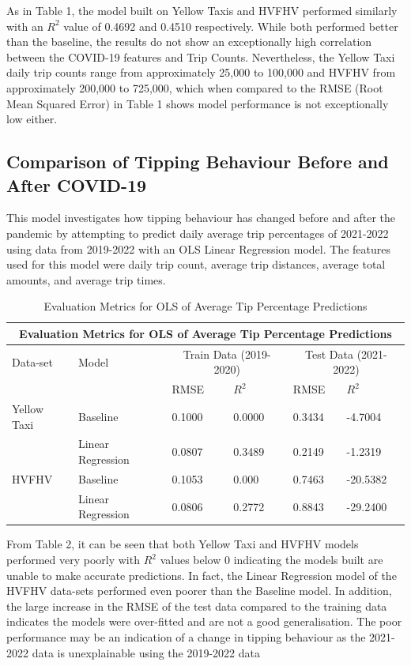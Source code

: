 \documentclass[11pt]{article}
\begin{document}
As in Table 1, the model built on Yellow Taxis and HVFHV performed similarly with an \(R^2\) value of 0.4692 and 0.4510 respectively. While both performed better than the baseline, the results do not show an exceptionally high correlation between the COVID-19 features and Trip Counts. Nevertheless, the Yellow Taxi daily trip counts range from approximately 25,000 to 100,000 and HVFHV from approximately 200,000 to 725,000, which when compared to the RMSE (Root Mean Squared Error) in Table 1 shows model performance is not exceptionally low either. 

\subsection{Comparison of Tipping Behaviour Before and After COVID-19}

This model investigates how tipping behaviour has changed before and after the pandemic by attempting to predict daily average trip percentages of 2021-2022 using data from 2019-2022 with an OLS Linear Regression model. The features used for this model were daily trip count, average trip distances, average total amounts, and average trip times. 

\begin{table}[]
    \centering
    \begin{tabularx}{\linewidth}{|l|l||*{4}{X|}}
        \hline
        \multicolumn{6}{|c|}{Evaluation Metrics for OLS of Average Tip Percentage Predictions} \\
        \hline 
        Data-set & Model & \multicolumn{2}{|c|}{Train Data (2019-2020)} & \multicolumn{2}{|c|}{Test Data (2021-2022)}\\
        \cline{3-6}
        & & RMSE & \(R^2\) & RMSE & \(R^2\)\\
        \hline 
        Yellow Taxi & Baseline &  0.1000 & 0.0000 & 0.3434 & -4.7004\\
        & Linear Regression & 0.0807 & 0.3489 & 0.2149 & -1.2319 \\
        \hline
        HVFHV & Baseline & 0.1053 & 0.000 & 0.7463 & -20.5382 \\
        & Linear Regression & 0.0806 & 0.2772 & 0.8843 & -29.2400 \\
        \hline
    \end{tabularx}
    \caption{Evaluation Metrics for OLS of Average Tip Percentage Predictions}
    \label{tab:my_label}
\end{table}

From Table 2, it can be seen that both Yellow Taxi and HVFHV models performed very poorly with \(R^2\) values below 0 indicating the models built are unable to make accurate predictions. In fact, the Linear Regression model of the HVFHV data-sets performed even poorer than the Baseline model. In addition, the large increase in the RMSE of the test data compared to the training data indicates the models were over-fitted and are not a good generalisation. The poor performance may be an indication of a change in tipping behaviour as the 2021-2022 data is unexplainable using the 2019-2022 data 
\end{document}

